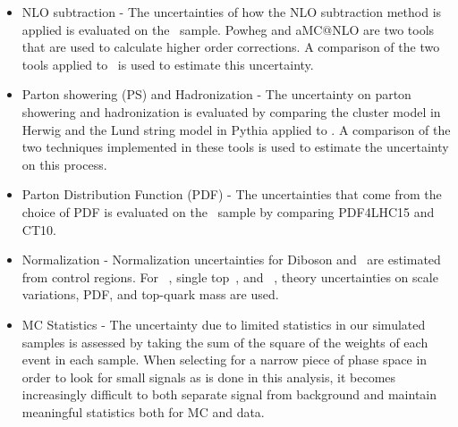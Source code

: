 \begin{itemize}
\item NLO subtraction - The uncertainties of how the NLO subtraction method is applied is evaluated on the \TTB~sample. Powheg and aMC@NLO are two tools that are used to calculate higher order corrections. A comparison of the two tools applied to \TTB~is used to estimate this uncertainty.

\item Parton showering (PS) and Hadronization - The uncertainty on parton showering and hadronization is evaluated by comparing the cluster model in Herwig and the Lund string model in Pythia applied to \TTB. A comparison of the two techniques implemented in these tools is used to estimate the uncertainty on this process. 

\item Parton Distribution Function (PDF) - The uncertainties that come from the choice of PDF is evaluated on the \TTB~sample by comparing PDF4LHC15 and CT10. 

\item Normalization - Normalization uncertainties for Diboson and \zjets~are estimated from control regions. For \TTB~\cite{ttbarxsecUNCERT}, single top~\cite{sgtopxsecUNCERT}, and \ttz~\cite{ttVxsecUNCERT}, theory uncertainties on scale variations, PDF, and top-quark mass are used.

\item MC Statistics - The uncertainty due to limited statistics in our simulated samples is assessed by taking the sum of the square of the weights of each event in each sample. When selecting for a narrow piece of phase space in order to look for small signals as is done in this analysis, it becomes increasingly difficult to both separate signal from background and maintain meaningful statistics both for MC and data.


\end{itemize}




